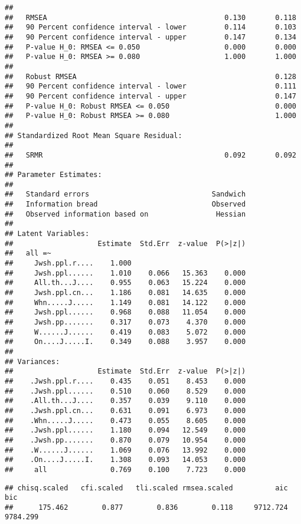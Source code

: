\documentclass[
  doc,draftall]{apa6}
\begin{document}
\begin{verbatim}
## 
##   RMSEA                                          0.130       0.118
##   90 Percent confidence interval - lower         0.114       0.103
##   90 Percent confidence interval - upper         0.147       0.134
##   P-value H_0: RMSEA <= 0.050                    0.000       0.000
##   P-value H_0: RMSEA >= 0.080                    1.000       1.000
##                                                                   
##   Robust RMSEA                                               0.128
##   90 Percent confidence interval - lower                     0.111
##   90 Percent confidence interval - upper                     0.147
##   P-value H_0: Robust RMSEA <= 0.050                         0.000
##   P-value H_0: Robust RMSEA >= 0.080                         1.000
## 
## Standardized Root Mean Square Residual:
## 
##   SRMR                                           0.092       0.092
## 
## Parameter Estimates:
## 
##   Standard errors                             Sandwich
##   Information bread                           Observed
##   Observed information based on                Hessian
## 
## Latent Variables:
##                    Estimate  Std.Err  z-value  P(>|z|)
##   all =~                                              
##     Jwsh.ppl.r....    1.000                           
##     Jwsh.ppl......    1.010    0.066   15.363    0.000
##     All.th...J....    0.955    0.063   15.224    0.000
##     Jwsh.ppl.cn...    1.186    0.081   14.635    0.000
##     Whn.....J.....    1.149    0.081   14.122    0.000
##     Jwsh.ppl......    0.968    0.088   11.054    0.000
##     Jwsh.pp.......    0.317    0.073    4.370    0.000
##     W......J......    0.419    0.083    5.072    0.000
##     On....J.....I.    0.349    0.088    3.957    0.000
## 
## Variances:
##                    Estimate  Std.Err  z-value  P(>|z|)
##    .Jwsh.ppl.r....    0.435    0.051    8.453    0.000
##    .Jwsh.ppl......    0.510    0.060    8.529    0.000
##    .All.th...J....    0.357    0.039    9.110    0.000
##    .Jwsh.ppl.cn...    0.631    0.091    6.973    0.000
##    .Whn.....J.....    0.473    0.055    8.605    0.000
##    .Jwsh.ppl......    1.180    0.094   12.549    0.000
##    .Jwsh.pp.......    0.870    0.079   10.954    0.000
##    .W......J......    1.069    0.076   13.992    0.000
##    .On....J.....I.    1.308    0.093   14.053    0.000
##     all               0.769    0.100    7.723    0.000
\end{verbatim}

\begin{verbatim}
## chisq.scaled   cfi.scaled   tli.scaled rmsea.scaled          aic          bic 
##      175.462        0.877        0.836        0.118     9712.724     9784.299
\end{verbatim}
\end{document}
